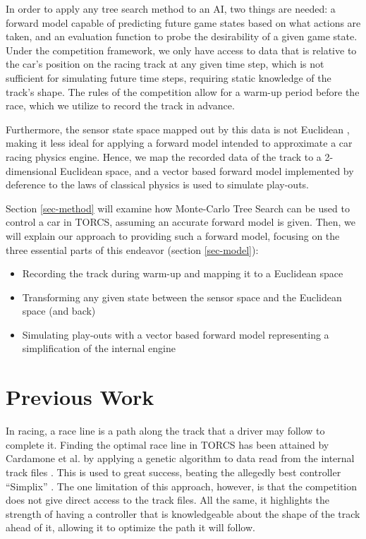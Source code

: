 \documentclass[conference]{IEEEtran}
\begin{document}
In order to apply any tree search method to an AI, two things are needed: a forward model capable of predicting future game states based on what actions are taken, and an evaluation function to probe the desirability of a given game state. Under the competition framework, we only have access to data that is relative to the car's position on the racing track at any given time step, which is not sufficient for simulating future time steps, requiring static knowledge of the track's shape. The rules of the competition \cite{manual} allow for a warm-up period before the race, which we utilize to record the track in advance.

Furthermore, the sensor state space mapped out by this data is not Euclidean \cite{euclidean}, making it less ideal for applying a forward model intended to approximate a car racing physics engine. Hence, we map the recorded data of the track to a 2-dimensional Euclidean space, and a vector based forward model implemented by deference to the laws of classical physics is used to simulate play-outs.

Section \ref{sec-method} will examine how Monte-Carlo Tree Search can be used to control a car in TORCS, assuming an accurate forward model is given. Then, we will explain our approach to providing such a forward model, focusing on the three essential parts of this endeavor (section \ref{sec-model}):
\begin{itemize}
\item Recording the track during warm-up and mapping it to a Euclidean space
\item Transforming any given state between the sensor space and the Euclidean space (and back)
\item Simulating play-outs with a vector based forward model representing a simplification of the internal engine
\end{itemize}

\section {Previous Work}
\label{sec-background}
In racing, a race line \cite{raceline} is a path along the track that a driver may follow to complete it. Finding the optimal race line in TORCS has been attained by Cardamone et al. by applying a genetic algorithm to data read from the internal track files \cite{optimalraceline}. This is used to great success, beating the allegedly best controller ``Simplix” \cite{simplix}. The one limitation of this approach, however, is that the competition does not give direct access to the track files. All the same, it highlights the strength of having a controller that is knowledgeable about the shape of the track ahead of it, allowing it to optimize the path it will follow.
\end{document}
